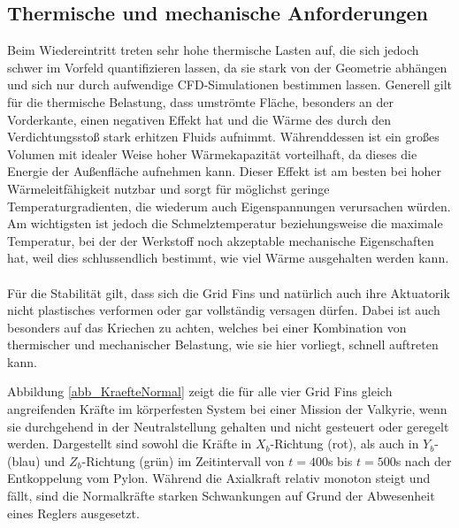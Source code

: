 \subsection{Thermische und mechanische Anforderungen}\label{sec:MechAnford}
Beim Wiedereintritt treten sehr hohe thermische Lasten auf, die sich jedoch schwer im Vorfeld quantifizieren lassen, da sie stark von der Geometrie abhängen und sich nur durch aufwendige CFD-Simulationen bestimmen lassen. Generell gilt für die thermische Belastung, dass umströmte Fläche, besonders an der Vorderkante, einen negativen Effekt hat und die Wärme des durch den Verdichtungsstoß stark erhitzen Fluids aufnimmt. Währenddessen ist ein großes Volumen mit idealer Weise hoher Wärmekapazität vorteilhaft, da dieses die Energie der Außenfläche aufnehmen kann. Dieser Effekt ist am besten bei hoher Wärmeleitfähigkeit nutzbar und sorgt für möglichst geringe Temperaturgradienten, die wiederum auch Eigenspannungen verursachen würden. Am wichtigsten ist jedoch die Schmelztemperatur beziehungsweise die maximale Temperatur, bei der der Werkstoff noch akzeptable mechanische Eigenschaften hat, weil dies schlussendlich bestimmt, wie viel Wärme ausgehalten werden kann.
\\~\\
Für die Stabilität gilt, dass sich die Grid Fins und natürlich auch ihre Aktuatorik nicht plastisches verformen oder gar vollständig versagen dürfen. Dabei ist auch besonders auf das Kriechen zu achten, welches bei einer Kombination von thermischer und mechanischer Belastung, wie sie hier vorliegt, schnell auftreten kann.

Abbildung \ref{abb_KraefteNormal} zeigt die für alle vier Grid Fins gleich angreifenden Kräfte im körperfesten System bei einer Mission der Valkyrie, wenn sie durchgehend in der Neutralstellung gehalten und nicht gesteuert oder geregelt werden. Dargestellt sind sowohl die Kräfte in $X_b$-Richtung (rot), als auch in $Y_b$- (blau) und $Z_b$-Richtung (grün) im Zeitintervall von $t=400$s bis $t=500$s nach der Entkoppelung vom Pylon. Während die Axialkraft relativ monoton steigt und fällt, sind die Normalkräfte starken Schwankungen auf Grund der Abwesenheit eines Reglers ausgesetzt.

